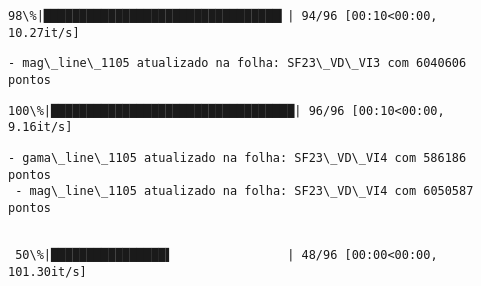 \documentclass[11pt]{article}
\begin{document}
    \begin{Verbatim}[commandchars=\\\{\}]
 98\%|█████████████████████████████████▎| 94/96 [00:10<00:00, 10.27it/s]
    \end{Verbatim}

    \begin{Verbatim}[commandchars=\\\{\}]
 - mag\_line\_1105 atualizado na folha: SF23\_VD\_VI3 com 6040606 pontos
    \end{Verbatim}

    \begin{Verbatim}[commandchars=\\\{\}]
100\%|██████████████████████████████████| 96/96 [00:10<00:00,  9.16it/s]
    \end{Verbatim}

    \begin{Verbatim}[commandchars=\\\{\}]
 - gama\_line\_1105 atualizado na folha: SF23\_VD\_VI4 com 586186 pontos
 - mag\_line\_1105 atualizado na folha: SF23\_VD\_VI4 com 6050587 pontos
    \end{Verbatim}

    \begin{Verbatim}[commandchars=\\\{\}]

 50\%|████████████████▌                | 48/96 [00:00<00:00, 101.30it/s]
    \end{Verbatim}
\end{document}
